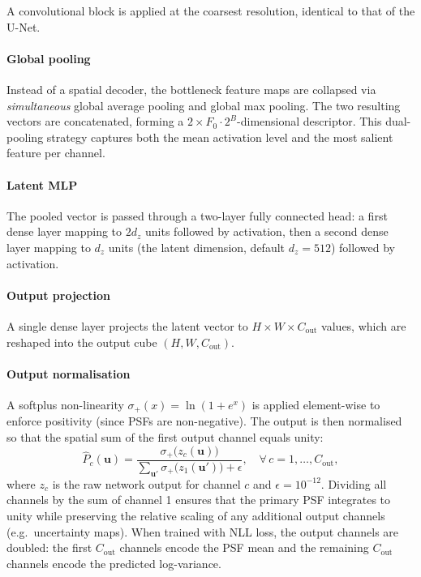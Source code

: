 \documentclass{aa}
\begin{document}
A convolutional block is applied at the coarsest resolution, identical to that of the U-Net.

\paragraph{Global pooling}

Instead of a spatial decoder, the bottleneck feature maps are collapsed via \emph{simultaneous} global average pooling and global max pooling. The two resulting vectors are concatenated, forming a $2 \times F_0 \cdot 2^B$-dimensional descriptor. This dual-pooling strategy captures both the mean activation level and the most salient feature per channel.

\paragraph{Latent MLP}

The pooled vector is passed through a two-layer fully connected head: a first dense layer mapping to $2 d_z$ units followed by activation, then a second dense layer mapping to $d_z$ units (the latent dimension, default $d_z = 512$) followed by activation.

\paragraph{Output projection}

A single dense layer projects the latent vector to $H \times W \times C_\mathrm{out}$ values, which are reshaped into the output cube $(H, W, C_\mathrm{out})$.

\paragraph{Output normalisation}

A softplus non-linearity $\sigma_+(x) = \ln(1 + e^x)$ is applied element-wise to enforce positivity (since PSFs are non-negative). The output is then normalised so that the spatial sum of the first output channel equals unity:
\begin{equation}
\hat{P}_{c}(\mathbf{u}) =
\frac{\sigma_+\!\bigl(z_c(\mathbf{u})\bigr)}
{\sum_{\mathbf{u}'} \sigma_+\!\bigl(z_1(\mathbf{u}')\bigr) + \epsilon},
\quad \forall\, c = 1, \ldots, C_\mathrm{out},
\end{equation}
where $z_c$ is the raw network output for channel $c$ and $\epsilon = 10^{-12}$. Dividing all channels by the sum of channel 1 ensures that the primary PSF integrates to unity while preserving the relative scaling of any additional output channels (e.g.\ uncertainty maps). When trained with NLL loss, the output channels are doubled: the first $C_\mathrm{out}$ channels encode the PSF mean and the remaining $C_\mathrm{out}$ channels encode the predicted log-variance.
\end{document}
